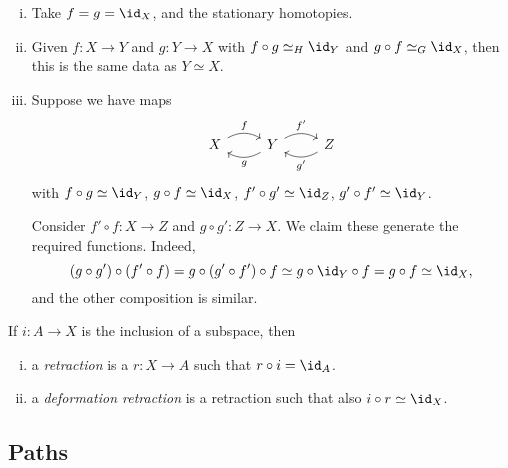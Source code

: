 \documentclass[12pt]{article}
\begin{document}
\begin{proofbox}
	
	\begin{enumerate}[(i)]
		\item Take $f = g = \id_X$, and the stationary homotopies.
		\item Given $f : X \to Y$ and $g : Y \to X$ with $f \circ g \simeq_H \id_Y$ and $g \circ f \simeq_G \id_X$, then this is the same data as $Y \simeq X$.
		\item Suppose we have maps
			\[
			\begin{tikzcd}
				X \arrow[r, bend left, "f"] & Y \arrow[r, bend left, "f'"] \arrow[l, bend left, "g"] & Z\arrow[l, bend left, "g'"]
			\end{tikzcd}
			\]
			with $f \circ g \simeq \id_Y$, $g \circ f \simeq \id_X$, $f' \circ g' \simeq \id_Z$, $g' \circ f' \simeq \id_Y$.

			Consider $f' \circ f : X \to Z$ and $g \circ g' : Z \to X$. We claim these generate the required functions. Indeed,
			\[
				(g \circ g') \circ (f' \circ f) = g \circ (g' \circ f') \circ f \simeq g \circ \id_Y \circ f = g \circ f \simeq \id_X,
			\]
			and the other composition is similar.
	\end{enumerate}
\end{proofbox}

\begin{definition}
	If $i : A \to X$ is the inclusion of a subspace, then
	\begin{enumerate}[(i)]
		\item a \emph{retraction} is a $r : X \to A$ such that $r \circ i = \id_A$.
		\item a \emph{deformation retraction} is a retraction such that also $i \circ r \simeq \id_X$.
	\end{enumerate}
\end{definition}

\subsection{Paths}
\label{sub:path}
\end{document}
